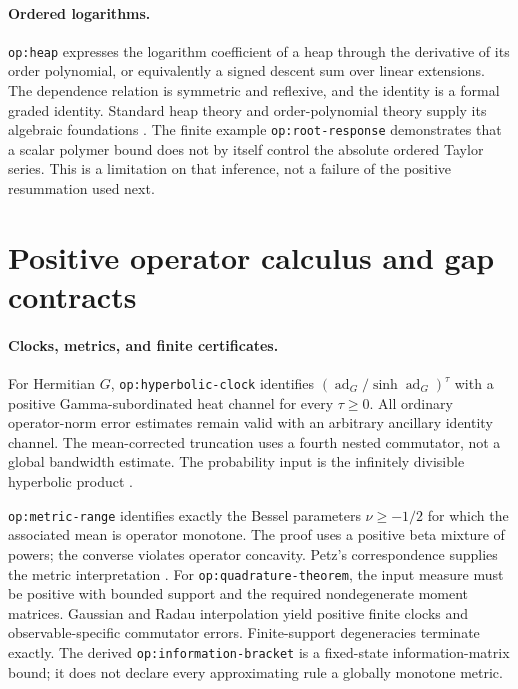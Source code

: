 \paragraph{Ordered logarithms.}
\texttt{op:heap} expresses the logarithm coefficient of a heap through
the derivative of its order polynomial, or equivalently a signed
descent sum over linear extensions. The dependence relation is symmetric
and reflexive, and the identity is a formal graded identity. Standard
heap theory and order-polynomial theory supply its algebraic foundations
\citep{CartierFoata1969,Viennot1986,Stanley1986}.
The finite example \texttt{op:root-response} demonstrates that a scalar
polymer bound does not by itself control the absolute ordered Taylor
series. This is a limitation on that inference, not a failure of the
positive resummation used next.

\section{Positive operator calculus and gap contracts}

\paragraph{Clocks, metrics, and finite certificates.}
For Hermitian $G$, \texttt{op:hyperbolic-clock} identifies
$(\operatorname{ad}_G/\sinh\operatorname{ad}_G)^\tau$ with a positive
Gamma-subordinated heat channel for every $\tau\ge0$.
All ordinary operator-norm error estimates remain valid with an
arbitrary ancillary identity channel. The mean-corrected truncation
uses a fourth nested commutator, not a global bandwidth estimate.
The probability input is the infinitely divisible hyperbolic product
\citep{PitmanYor2003}.

\texttt{op:metric-range} identifies exactly the Bessel parameters
$\nu\ge-1/2$ for which the associated mean is operator monotone.
The proof uses a positive beta mixture of powers; the converse violates
operator concavity. Petz's correspondence supplies the metric
interpretation \citep{Petz1996,HiaiKosakiPetzRuskai2013}.
For \texttt{op:quadrature-theorem}, the input measure must be positive
with bounded support and the required nondegenerate moment matrices.
Gaussian and Radau interpolation yield positive finite clocks and
observable-specific commutator errors. Finite-support degeneracies
terminate exactly. The derived \texttt{op:information-bracket} is a
fixed-state information-matrix bound; it does not declare every
approximating rule a globally monotone metric.

